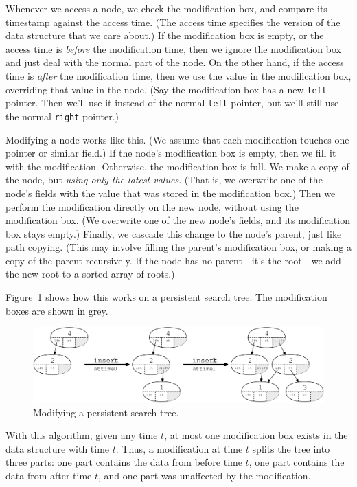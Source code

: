 \documentclass{article}
\begin{document}
Whenever we access a node, we check the modification box, and compare its
timestamp against the access time. (The access time specifies the version
of the data structure that we care about.) If the modification box is
empty, or the access time is \emph{before} the modification time, then we
ignore the modification box and just deal with the normal part of the node.
On the other hand, if the access time is \emph{after} the modification
time, then we use the value in the modification box, overriding that value
in the node. (Say the modification box has a new \texttt{left} pointer.
Then we'll use it instead of the normal \texttt{left} pointer, but we'll
still use the normal \texttt{right} pointer.)

Modifying a node works like this. (We assume that each modification touches
one pointer or similar field.) If the node's modification box is empty,
then we fill it with the modification. Otherwise, the modification box is
full. We make a copy of the node, but \emph{using only the latest values}.
(That is, we overwrite one of the node's fields with the value that was
stored in the modification box.) Then we perform the modification directly
on the new node, without using the modification box. (We overwrite one of
the new node's fields, and its modification box stays empty.) Finally, we
cascade this change to the node's parent, just like path copying. (This may
involve filling the parent's modification box, or making a copy of the
parent recursively. If the node has no parent---it's the root---we add the
new root to a sorted array of roots.)

Figure~\ref{slt-mod} shows how this works on a persistent search tree. The
modification boxes are shown in grey.

\begin{figure}[ht]
\begin{center}
  \includegraphics{scribe5fig.3.png}
\end{center}
\caption{Modifying a persistent search tree.}
\label{slt-mod}
\end{figure}

With this algorithm, given any time $t$, at most one modification box
exists in the data structure with time $t$. Thus, a modification at time
$t$ splits the tree into three parts: one part contains the data from
before time $t$, one part contains the data from after time $t$, and one
part was unaffected by the modification.
\end{document}
